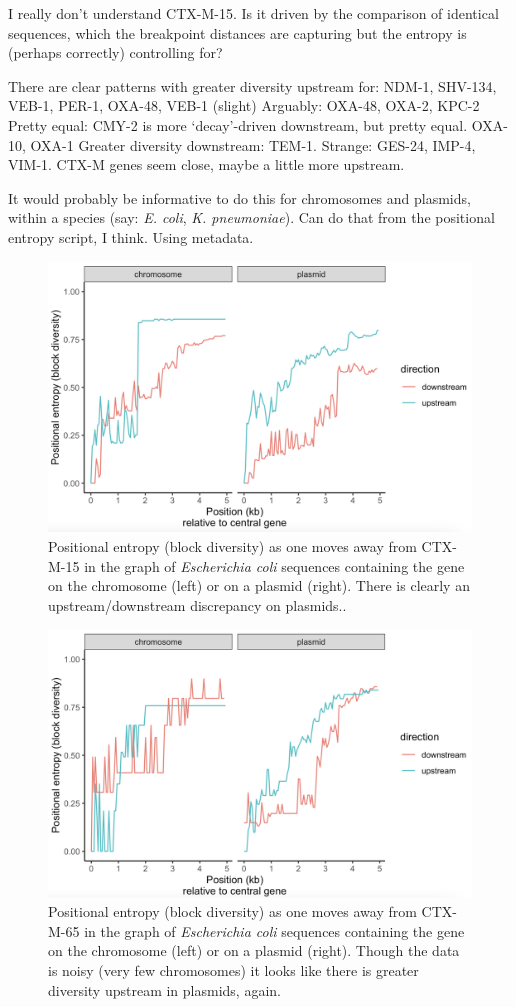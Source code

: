 \documentclass[aps,rmp,preprint,superscriptaddress,10pt,twocolumn]{revtex4-1}
\begin{document}
I really don't understand CTX-M-15. Is it driven by the comparison of identical sequences, which the breakpoint distances are capturing but the entropy is (perhaps correctly) controlling for? 

There are clear patterns with greater diversity upstream for: NDM-1, SHV-134, VEB-1, PER-1, OXA-48, VEB-1 (slight)
Arguably: OXA-48, OXA-2, KPC-2
Pretty equal: CMY-2 is more `decay'-driven downstream, but pretty equal. OXA-10, OXA-1
Greater diversity downstream: TEM-1.
Strange: GES-24, IMP-4, VIM-1. 
CTX-M genes seem close, maybe a little more upstream. 

It would probably be informative to do this for chromosomes and plasmids, within a species (say: \textit{E. coli}, \textit{K. pneumoniae}). Can do that from the positional entropy script, I think. Using metadata. 

\begin{figure}
    \centering
\includegraphics[width=0.5\linewidth]{figs/CTX-M-15-escherichia-coli-positional-entropy.png}
    \caption{Positional entropy (block diversity) as one moves away from CTX-M-15 in the graph of \textit{Escherichia coli} sequences containing the gene on the chromosome (left) or on a plasmid (right). There is clearly an upstream/downstream discrepancy on plasmids..}
    \label{fig:CTX-M-15-ecoli-positional-entropy}
\end{figure}

\begin{figure}
    \centering
\includegraphics[width=0.5\linewidth]{figs/CTX-M-65-ecoli-positional-entropy.png}
    \caption{Positional entropy (block diversity) as one moves away from CTX-M-65 in the graph of \textit{Escherichia coli} sequences containing the gene on the chromosome (left) or on a plasmid (right). Though the data is noisy (very few chromosomes) it looks like there is greater diversity upstream in plasmids, again.}
    \label{fig:CTX-M-65-ecoli-positional-entropy}
\end{figure}
\end{document}
